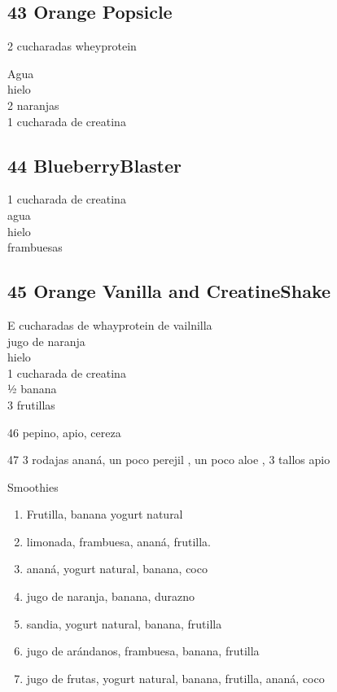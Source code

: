 \subsection{\texorpdfstring{\textbf{43 Orange
Popsicle}}{43 Orange Popsicle}}\label{orange-popsicle}

2 cucharadas wheyprotein

Agua\\
hielo\\
2 naranjas\\
1 cucharada de creatina

\subsection{\texorpdfstring{\textbf{44
BlueberryBlaster}}{44 BlueberryBlaster}}\label{blueberryblaster}

1 cucharada de creatina\\
agua\\
hielo\\
frambuesas

\subsection{\texorpdfstring{\textbf{45 Orange Vanilla and
CreatineShake}}{45 Orange Vanilla and CreatineShake}}\label{orange-vanilla-and-creatineshake}

E cucharadas de whayprotein de vailnilla\\
jugo de naranja\\
hielo\\
1 cucharada de creatina\\
½ banana\\
3 frutillas

46 pepino, apio, cereza

47 3 rodajas ananá, un poco perejil , un poco aloe , 3 tallos apio

Smoothies

\begin{enumerate}
\def\labelenumi{\arabic{enumi}.}
\item
  Frutilla, banana yogurt natural
\item
  limonada, frambuesa, ananá, frutilla.
\item
  ananá, yogurt natural, banana, coco
\item
  jugo de naranja, banana, durazno
\item
  sandia, yogurt natural, banana, frutilla
\item
  jugo de arándanos, frambuesa, banana, frutilla
\item
  jugo de frutas, yogurt natural, banana, frutilla, ananá, coco
\end{enumerate}

